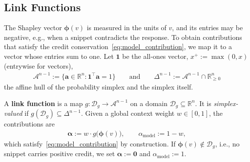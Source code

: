 \subsection{Link Functions}
\label{subsec:link_functions}

The Shapley vector $\boldsymbol{\phi}(v)$ is measured in the units of $v$, and its entries may be negative, e.g., when a snippet contradicts the response. To obtain contributions that satisfy the credit conservation~\eqref{eq:model_contribution}, we map it to a vector whose entries sum to one. Let $\mathbf{1}$ be the all-ones vector, $x^+ := \max(0, x)$ (entrywise for vectors),
\begin{align*}
    \mathcal{A}^{n-1} := \{\mathbf{a} \in \mathbb{R}^n : \mathbf{1}^\top \mathbf{a} = 1\} \qquad \text{and} \qquad \Delta^{n-1} := \mathcal{A}^{n-1} \cap \mathbb{R}^n_{\ge 0}
\end{align*}
the affine hull of the probability simplex and the simplex itself.

\begin{definition}\label{def:link}
A \textbf{link function} is a map $g: \mathcal{D}_g \to \mathcal{A}^{n-1}$ on a domain $\mathcal{D}_g \subseteq \mathbb{R}^n$. It is \emph{simplex-valued} if $g(\mathcal{D}_g) \subseteq \Delta^{n-1}$. Given a global context weight $w \in [0,1]$, the contributions are
\begin{align}\label{eq:link}
    \boldsymbol{\alpha} := w \cdot g\big(\boldsymbol{\phi}(v)\big), \qquad \alpha_{\text{model}} := 1 - w,
\end{align}
which satisfy~\eqref{eq:model_contribution} by construction. If $\boldsymbol{\phi}(v) \notin \mathcal{D}_g$, i.e., no snippet carries positive credit, we set $\boldsymbol{\alpha} := \mathbf{0}$ and $\alpha_{\text{model}} := 1$.
\end{definition}


